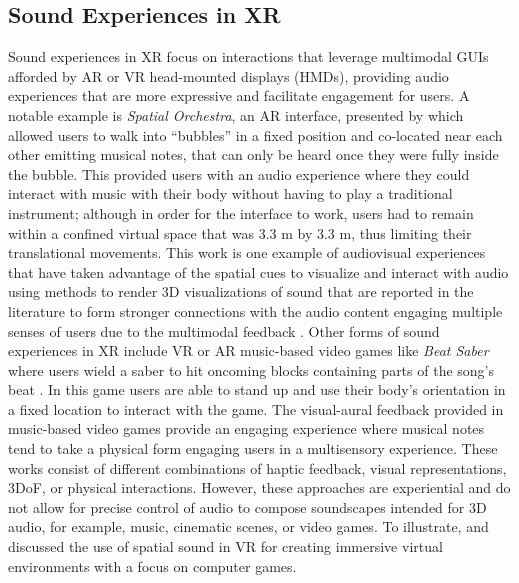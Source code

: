 \subsection{Sound Experiences in XR}
Sound experiences in XR focus on interactions that leverage multimodal GUIs afforded by AR or VR head-mounted displays (HMDs), providing audio experiences that are more expressive and facilitate engagement for users. A notable example is \emph{Spatial Orchestra}, an AR interface, presented by \citet{kim2024spatial} which allowed users to walk into \enquote{bubbles} in a fixed position and co-located near each other emitting musical notes, that can only be heard once they were fully inside the bubble. This provided users with an audio experience where they could interact with music with their body without having to play a traditional instrument; although in order for the interface to work, users had to remain within a confined virtual space that was 3.3 m by 3.3 m, thus limiting their translational movements. This work is one example of audiovisual experiences that have taken advantage of the spatial cues to visualize and interact with audio using methods to render 3D visualizations of sound that are reported in the literature to form stronger connections with the audio content engaging multiple senses of users due to the multimodal feedback \cite{bilbow2022evaluating,kim2024spatial,agrawal2019defining}. Other forms of sound experiences in XR include VR or AR music-based video games like \emph{Beat Saber} where users wield a saber to hit oncoming blocks containing parts of the song's beat \cite{beatSaber2024}. In this game users are able to stand up and use their body's orientation in a fixed location to interact with the game. The visual-aural feedback provided in music-based video games provide an engaging experience where musical notes tend to take a physical form engaging users in a multisensory experience. These works consist of different combinations of haptic feedback, visual representations, 3DoF, or physical interactions.  However, these approaches are experiential and do not allow for precise control of audio to compose soundscapes intended for 3D audio, for example, music, cinematic scenes, or video games. To illustrate, \cite{murphy2010spatial} and \cite{sinclair2020principles} discussed the use of spatial sound in VR for creating immersive virtual environments with a focus on computer games.

